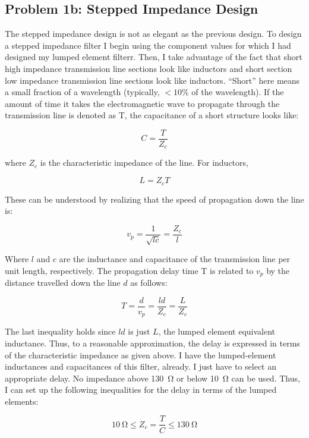     \subsection*{Problem 1b: Stepped Impedance Design}

    The stepped impedance design is not as elegant as the previous design. To design a
    stepped impedance filter I begin using the component values for which I had
    designed my lumped element filterr. Then, I take advantage of the fact
    that short high impedance transmission line sections look like inductors and
    short section low impedance transmission line sections look like inductors.
    ``Short'' here means a small fraction of a wavelength (typically, $ < 10\%$
    of the wavelength). If the amount of time it takes the electromagnetic wave
    to propagate through the transmission line is denoted as T, the capacitance
    of a short structure looks like:

    \[ 
        C = \frac{T}{Z_c} 
    \]

    where $Z_c$ is the characteristic impedance of the line. For inductors,

    \[ 
        L =Z_c T
    \]

    These can be understood by realizing that the speed of propagation down the
    line is:

    \[ 
        v_p = \frac{1}{\sqrt{lc}} = \frac{Z_c}{l}
    \]

    Where $l$ and $c$ are the inductance and capacitance of the transmission
    line per unit length, respectively.  The propagation delay time T is related
    to $v_p$ by the distance travelled down the line $d$ as follows:

    \[ 
        T = \frac{d}{v_p} = \frac{l d}{Z_c} = \frac{L}{Z_c}
    \]

    The last inequality holds since $l d$ is just $L$, the lumped element
    equivalent inductance. Thus, to a reasonable approximation, the delay is
    expressed in terms of the characteristic impedance as given above. I have
    the lumped-element inductances and capacitances of this filter, already. I
    just have to select an appropriate delay. No impedance above \SI{130}{\ohm}
    or below \SI{10}{\ohm} can be used. Thus, I can set up the following
    inequalities for the delay in terms of the lumped elements:

    \[
        \SI{10}{\ohm} \le Z_c = \frac{T}{C} \le \SI{130}{\ohm} 
    \]

